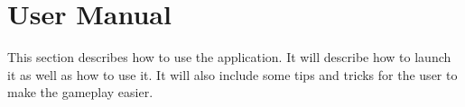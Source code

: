 \section{User Manual}
This section describes how to use the application. 
It will describe how to launch it as well as how to use it.
It will also include some tips and tricks for the user to make the gameplay easier.







